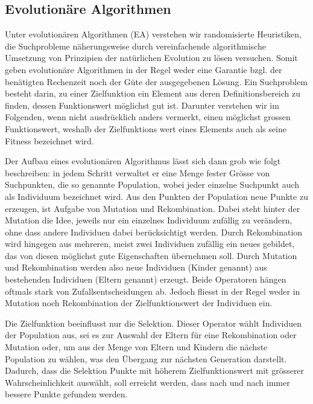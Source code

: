 \subsection{Evolutionäre Algorithmen}
\flqq Unter evolutionären Algorithmen (EA) verstehen wir randomisierte Heuristiken, die Suchprobleme näherungsweise durch vereinfachende algorithmische Umsetzung von
Prinzipien der natürlichen Evolution zu lösen versuchen. Somit geben evolutionäre Algorithmen in der Regel weder eine Garantie bzgl. der benätigten Rechenzeit noch der Güte der ausgegebenen Lösung. Ein Suchproblem besteht darin, zu einer Zielfunktion ein Element aus deren Definitionsbereich zu finden, dessen Funktionswert möglichst gut ist. Darunter verstehen wir im Folgenden, wenn nicht ausdrücklich anders vermerkt, einen möglichst grossen Funktionswert, weshalb der Zielfunktions wert eines Elements auch als seine Fitness bezeichnet wird.

Der Aufbau eines evolutionären Algorithmus lässt sich dann grob wie folgt beschreiben: in jedem Schritt verwaltet er eine Menge fester Grösse von Suchpunkten, die so genannte Population, wobei jeder einzelne Suchpunkt auch als Individuum bezeichnet wird. Aus den Punkten der Population neue Punkte zu erzeugen, ist Aufgabe von Mutation und Rekombination. Dabei steht hinter der Mutation die Idee, jeweils nur ein einzelnes Individuum zufällig zu verändern, ohne dass andere Individuen dabei berücksichtigt werden. Durch Rekombination wird hingegen aus mehreren, meist zwei Individuen zufällig ein neues gebildet, das von diesen möglichst gute Eigenschaften übernehmen soll. Durch Mutation und Rekombination werden also neue Individuen (Kinder genannt) aus bestehenden Individuen (Eltern genannt) erzeugt. Beide Operatoren hängen oftmals stark von Zufallsentscheidungen ab. Jedoch fliesst in der Regel weder in Mutation noch Rekombination der Zielfunktionswert der Individuen ein.

Die Zielfunktion beeinflusst nur die Selektion. Dieser Operator wählt Individuen der Population aus, sei es zur Auswahl der Eltern für eine Rekombination oder Mutation oder, um aus der Menge von Eltern und Kindern die nächste Population zu wählen, was den Übergang zur nächsten Generation darstellt. Dadurch, dass die Selektion Punkte mit höherem Zielfunktionswert mit grösserer Wahrscheinlichkeit auswählt, soll erreicht werden, dass nach und nach immer bessere Punkte gefunden werden.\frqq \cite{droste}

